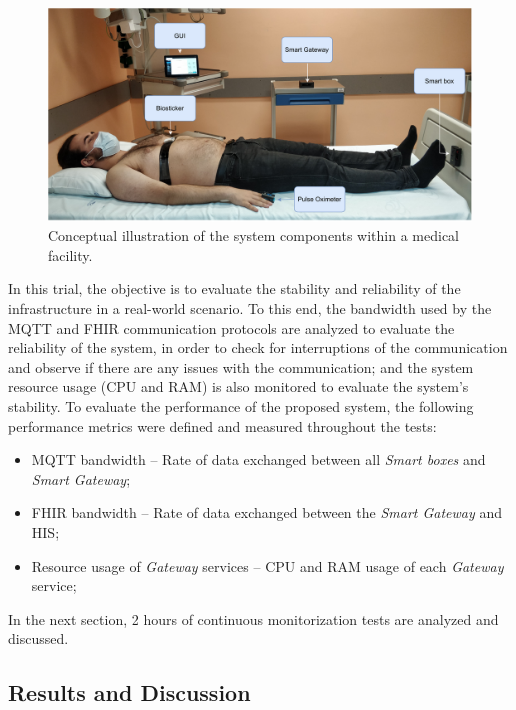 \begin{figure}[H]
    \centering
    \includegraphics[width=\linewidth]{images/hospital-trial-setup.pdf}
    \caption[Conceptual illustration of the system components within a medical facility.]{Conceptual illustration of the system components within a medical facility.}
    \label{fig:hospital-trial}
\end{figure}

In this trial, the objective is to evaluate the stability and reliability of the infrastructure in a real-world scenario. To this end, the bandwidth used by the \acs{MQTT} and \acs{FHIR} communication protocols are analyzed to evaluate the reliability of the system, in order to check for interruptions of the communication and observe if there are any issues with the communication; and the system resource usage (\acs{CPU} and \acs{RAM}) is also monitored to evaluate the system's stability. To evaluate the performance of the proposed system, the following performance metrics were defined and measured throughout the tests:

\begin{itemize}
    \item \acs{MQTT} bandwidth -- Rate of data exchanged between all \textit{Smart boxes} and \textit{Smart Gateway};
    \item \acs{FHIR} bandwidth -- Rate of data exchanged between the \textit{Smart Gateway} and \acs{HIS};
    \item Resource usage of \textit{Gateway} services -- \acs{CPU} and \acs{RAM} usage of each \textit{Gateway} service;
\end{itemize}

In the next section, 2 hours of continuous monitorization tests are analyzed and discussed. 

\subsection{Results and Discussion}

